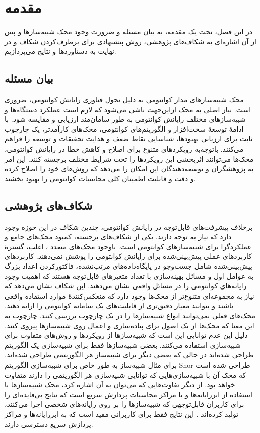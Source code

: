 \chapter{مقدمه}
در این فصل، تحت یک مقدمه، به بیان مسئله و ضرورت وجود محک شبیه‌سازها و پس از آن اشاره‌ای به شکاف‌های پژوهشی، روش پیشنهادی برای برطرف‌کردن شکاف و در نهایت به دستاوردها و نتایج می‌پردازیم.
\section{بیان مسئله}
محک شبیه‌سازهای مدار کوانتومی به دلیل تحول فناوری رایانش کوانتومی، ضروری است. نیاز اصلی به محک ازاین‌جهت ناشی می‌شود که لازم است عملکرد دستگاه‌ها و شبیه‌سازهای مختلف رایانش کوانتومی به طور سامان‌مند ارزیابی و مقایسه شود. با ادامهٔ توسعهٔ سخت‌افزار و الگوریتم‌های کوانتومی، محک‌های کارآمدتر، یک چارچوب ثابت برای ارزیابی بهبودها، شناسایی نقاط ضعف و هدایت تحقیقات و توسعه را فراهم می‌کنند. باتوجه‌به رویکردهای متنوع برای اصلاح و کاهش خطا در رایانش کوانتومی، محک‌ها می‌توانند اثربخشی این رویکرد‌ها را تحت شرایط مختلف برجسته کنند. این امر به پژوهشگران و توسعه‌دهندگان این امکان را می‌دهد که روش‌های خود را اصلاح کرده و دقت و قابلیت اطمینان کلی محاسبات کوانتومی را بهبود بخشند\cite{lubinski_application-oriented_2023}.

\section{شکاف‌های پژوهشی}
برخلاف پیشرفت‌های قابل‌توجه در رایانش کوانتومی، چندین شکاف در این حوزه وجود دارد که نیاز به توجه دارند. یکی از شکاف‌های برجسته، کمبود محک‌های جامع و عملکردگرا برای شبیه‌سازهای کوانتومی است. باوجود محک‌های متعدد 
\cite{michielsen_benchmarking_2017, wright_benchmarking_2019, koch_demonstrating_2020, mills_application-motivated_2021, cornelissen_scalable_2021}،
اغلب، گسترهٔ کاربردهای عملی پیش‌بینی‌شده برای رایانش کوانتومی را پوشش نمی‌دهند. کاربردهای پیش‌بینی‌شده شامل جست‌وجو در پایگاه‌داده‌های مرتب‌نشده، فاکتورکردن اعداد بزرگ به عوامل اول و مسائل بهینه‌سازی با تعداد متغیرهای قابل‌توجه هستند که اهمیت وجود رایانه‌های کوانتومی را در مسائل واقعی نشان می‌دهند. این شکاف نشان می‌دهد که نیاز به مجموعه‌ای متنوع‌تر از محک‌ها وجود دارد که منعکس‌کنندهٔ موارد استفاده واقعی باشند و بتوانند معیار دقیق‌تری از قابلیت‌های یک سامانه کوانتومی را ارائه دهند. 
محک‌های فعلی نمی‌توانند انواع شبیه‌سازها را در یک چارچوب بررسی کنند. چارچوب به این معنا که محک‌ها از یک اصول برای پیاده‌سازی و اعمال روی شبیه‌سازها پیروی کنند. دلیل این عدم توانایی این است که شبیه‌سازها از رویکردها و روش‌های متفاوت برای شبیه‌سازی استفاده می‌کنند. بعضی شبیه‌سازها فقط برای شبیه‌سازی یک الگوریتم طراحی شده‌اند در حالی که بعضی دیگر برای شبیه‌ساز هر الگوریتمی طراحی شده‌اند.
برای مثال شبیه‌ساز
\cite{noauthor_quantum_nodate-1}
به طور خاص برای شبیه‌سازی الگوریتم Shor طراحی شده است که محک آن با شبیه‌سازی‌هایی که توانایی شبیه‌سازی هر الگوریتمی را دارند متفاوت خواهد بود. از دیگر تفاوت‌هایی که می‌توان به آن اشاره کرد، محک شبیه‌سازها با استفاده از ابررایانه‌ها و یا مراکز محاسبات پردازش سریع است که نتایج بی‌فایده‌ای را برای کاربران قابل‌توجهی که شبیه‌سازها را بر روی رایانه‌های شخصی اجرا می‌کنند، تولید کرده‌اند 
\cite{jamadagni_benchmarking_2024}.
این نتایج فقط برای کاربرانی مفید است که به ابررایانه‌ها و مراکز پردازش سریع دسترسی دارند.

